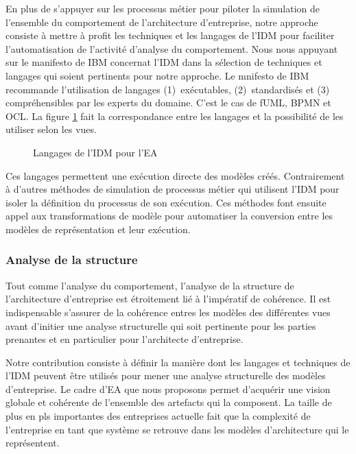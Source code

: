 En plus de s'appuyer sur les processus métier pour piloter la simulation de l'ensemble du comportement de l'architecture d'entreprise, notre approche consiste à mettre à profit les techniques et les langages de l'IDM pour faciliter l'automatisation de l'activité d'analyse du comportement. Nous nous appuyant sur le manifesto de IBM \cite{chesbrough2006research} concernat l'IDM dans la sélection de techniques et langages qui soient pertinents pour notre approche. Le mnifesto de IBM recommande l'utilisation de langages (1)~exécutables, (2)~standardisés et (3) compréhensibles par les experts du domaine. C'est le cas de fUML, BPMN et OCL. La figure \ref{fig:IDM_EA} fait la correspondance entre les langages et la possibilité de les utiliser selon les vues. 

\begin{figure}[!htbp]
    \begin{center}
        
    \end{center}
    \caption{Langages de l'IDM pour l'EA}
    \label{fig:IDM_EA}
\end{figure}

Ces langages permettent une exécution directe des modèles créés. Contrairement à d'autres méthodes de simulation de processus métier qui utilisent l'IDM pour isoler la définition du processus de son exécution. Ces méthodes font ensuite appel aux transformations de modèle pour automatiser la conversion entre les modèles de représentation et leur exécution. 

\subsubsection{Analyse de la structure}
Tout comme l'analyse du comportement, l'analyse de la structure de l'architecture d'entreprise est étroitement lié à l'impératif de cohérence.  Il est indispensable s'assurer de la cohérence entres les modèles des différentes vues avant d'initier une analyse structurelle qui soit pertinente pour les parties prenantes et en particulier pour l'architecte d'entreprise. 

Notre contribution consiste à définir la manière dont les langages et techniques de l'IDM peuvent être utilisés pour mener une analyse structurelle des modèles d'entreprise. Le cadre d'EA que nous proposons permet d'acquérir une vision globale et cohérente de l'ensemble des artefacts qui la composent. La taille de plus en pls importantes des entreprises actuelle fait que la complexité de l'entreprise en tant que système se retrouve dans les modèles d'architecture qui le représentent.

